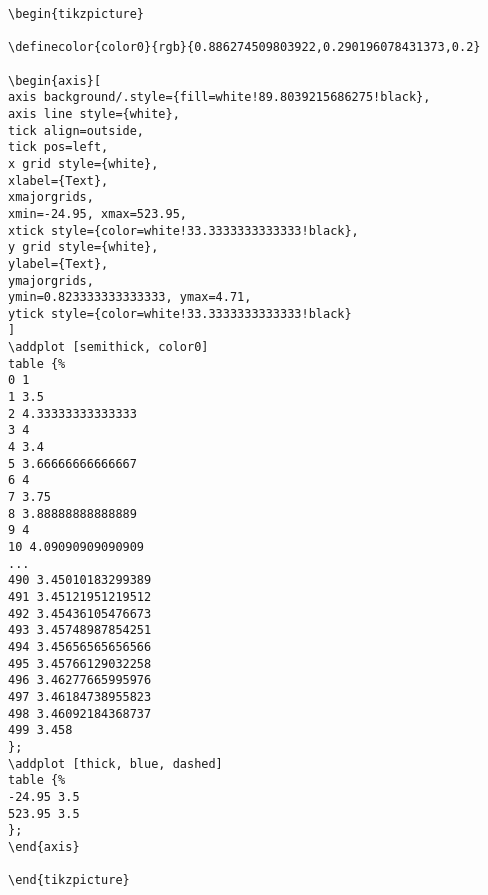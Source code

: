 \documentclass[12pt,a4paper]{article}
\begin{document}
\begin{lstlisting}
\begin{tikzpicture}

\definecolor{color0}{rgb}{0.886274509803922,0.290196078431373,0.2}

\begin{axis}[
axis background/.style={fill=white!89.8039215686275!black},
axis line style={white},
tick align=outside,
tick pos=left,
x grid style={white},
xlabel={Text},
xmajorgrids,
xmin=-24.95, xmax=523.95,
xtick style={color=white!33.3333333333333!black},
y grid style={white},
ylabel={Text},
ymajorgrids,
ymin=0.823333333333333, ymax=4.71,
ytick style={color=white!33.3333333333333!black}
]
\addplot [semithick, color0]
table {%
0 1
1 3.5
2 4.33333333333333
3 4
4 3.4
5 3.66666666666667
6 4
7 3.75
8 3.88888888888889
9 4
10 4.09090909090909
... 
490 3.45010183299389
491 3.45121951219512
492 3.45436105476673
493 3.45748987854251
494 3.45656565656566
495 3.45766129032258
496 3.46277665995976
497 3.46184738955823
498 3.46092184368737
499 3.458
};
\addplot [thick, blue, dashed]
table {%
-24.95 3.5
523.95 3.5
};
\end{axis}

\end{tikzpicture}

\end{lstlisting}
\end{document}
